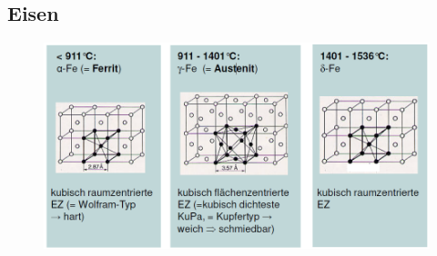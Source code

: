 \subsection{Eisen}
\begin{figure}[h!]
	\centering
	\includegraphics[width=0.9\linewidth]{images/3_Aufbau_Eisen.png}
\end{figure}

